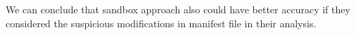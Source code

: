 \begin{obs}{3}{}
 We can conclude that sandbox approach also could have better accuracy if they considered the suspicious modifications in manifest file in their analysis.
\end{obs}

